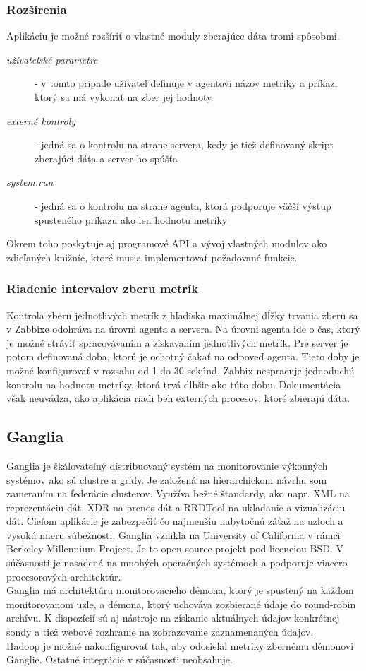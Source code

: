 \documentclass[printed,11pt,twoside,color,cover,table]{fithesis3}
\begin{document}
\subsubsection{Rozšírenia}
Aplikáciu je možné rozšíriť o vlastné moduly zberajúce dáta tromi spôsobmi. 
\begin{description}
\item[\emph{užívateľské parametre}] - v tomto prípade užívateľ definuje v agentovi názov metriky a príkaz, ktorý sa má vykonať na zber jej hodnoty
\item[\emph{externé kontroly}] - jedná sa o kontrolu na strane servera, kedy je tiež definovaný skript zberajúci dáta a server ho spúšťa
\item[\emph{system.run}] - jedná sa o kontrolu na strane agenta, ktorá podporuje väčší výstup spusteného príkazu ako len hodnotu metriky
\end{description}
\cite{zabbix-modules}
Okrem toho poskytuje aj programové API a vývoj vlastných modulov ako zdieľaných knižníc, ktoré musia implementovať požadované funkcie.

\subsubsection{Riadenie intervalov zberu metrík}
Kontrola zberu jednotlivých metrík z hľadiska maximálnej dĺžky trvania zberu sa v Zabbixe odohráva na úrovni agenta a servera. Na úrovni agenta ide o čas, ktorý je možné stráviť spracovávaním a získavaním
jednotlivých metrík. Pre server je potom definovaná doba, ktorú je ochotný čakať na odpoveď agenta. Tieto doby je možné konfigurovať v rozsahu od 1 do 30 sekúnd.\cite{zabbix-server}
Zabbix nespracuje jednoduchú kontrolu na hodnotu metriky, ktorá trvá dlhšie ako túto dobu.\cite{zabbix-limit}
Dokumentácia však neuvádza, ako aplikácia riadi beh externých procesov, ktoré zbierajú dáta.

\subsection{Ganglia} 
Ganglia je škálovateľný distribuovaný systém na monitorovanie výkonných systémov ako sú clustre a gridy. Je založená na hierarchickom návrhu 
som zameraním na federácie clusterov. Využíva bežné štandardy, ako napr. XML na reprezentáciu dát, XDR na prenos dát a RRDTool na
ukladanie a vizualizáciu dát.\cite{ganglia} 
Cieľom aplikácie je zabezpečiť čo najmenšiu nabytočnú záťaž na uzloch a vysokú
mieru súbežnosti. Ganglia vznikla na University of California v rámci Berkeley Millennium Project. Je to open-source projekt
pod licenciou BSD. V súčasnosti je nasadená na mnohých operačných systémoch a podporuje viacero procesorových architektúr.
\\Ganglia má architektúru monitorovacieho démona, ktorý je spustený na každom monitorovanom uzle, a démona, ktorý uchováva zozbierané údaje do
round-robin archívu.
K dispozícií sú aj nástroje na získanie aktuálnych údajov konkrétnej sondy a tiež webové rozhranie na zobrazovanie zaznamenaných údajov.
\\Hadoop je možné nakonfigurovať tak, aby odosielal metriky zbernému démonovi Ganglie. \cite{ganglia-hadoop} Ostatné integrácie v súčasnosti neobsahuje.
\end{document}
